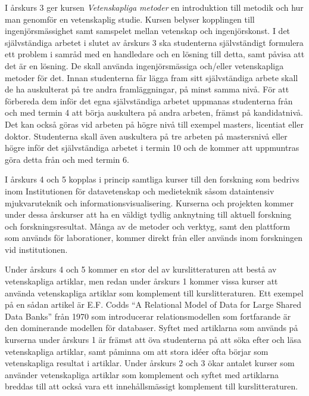 I årskurs 3 ger kursen \emph{Vetenskapliga metoder} en introduktion till metodik och hur man genomför en vetenskaplig studie. Kursen belyser kopplingen till ingenjörsmässighet samt samspelet mellan vetenskap och ingenjörskonst. I det självständiga arbetet i slutet av årskurs 3 ska studenterna självständigt formulera ett problem i samråd med en handledare och en lösning till detta, samt påvisa att det är en lösning. De skall använda ingenjörsmässiga och/eller vetenskapliga metoder för det. Innan studenterna får lägga fram sitt självständiga arbete skall de ha auskulterat på tre andra framläggningar, på minst samma nivå. För att förbereda dem inför det egna självständiga arbetet uppmanas studenterna från och med termin 4 att börja auskultera på andra arbeten, främst på kandidatnivå. Det kan också göras vid arbeten på högre nivå till exempel masters, licentiat eller doktor. Studenterna skall även auskultera på tre arbeten på mastersnivå eller högre inför det självständiga arbetet i termin 10 och de kommer att uppmuntras göra detta från och med termin 6.

I årskurs 4 och 5 kopplas i princip samtliga kurser till den forskning som bedrivs inom Institutionen för datavetenskap och medieteknik såsom dataintensiv mjukvaruteknik och informationsvisualisering. Kurserna och projekten kommer under dessa årskurser att ha en väldigt tydlig anknytning till aktuell forskning och forskningsresultat. Många av de metoder och verktyg, samt den plattform som används för laborationer, kommer direkt från eller används inom forskningen vid institutionen.

Under årskurs 4 och 5 kommer en stor del av kurslitteraturen att bestå av vetenskapliga artiklar, men redan under årskurs 1 kommer vissa kurser att använda vetenskapliga artiklar som komplement till kurslitteraturen. Ett exempel på en sådan artikel är E.F. Codds ``A Relational Model of Data for Large Shared Data Banks'' från 1970 som introducerar relationsmodellen som fortfarande är den dominerande modellen för databaser. Syftet med artiklarna som används på kurserna under årskurs 1 är främst att öva studenterna på att söka efter och läsa vetenskapliga artiklar, samt påminna om att stora idéer ofta börjar som vetenskapliga resultat i artiklar. Under årskurs 2 och 3 ökar antalet kurser som använder vetenskapliga artiklar som komplement och syftet med artiklarna breddas till att också vara ett innehållsmässigt komplement till kurslitteraturen.

